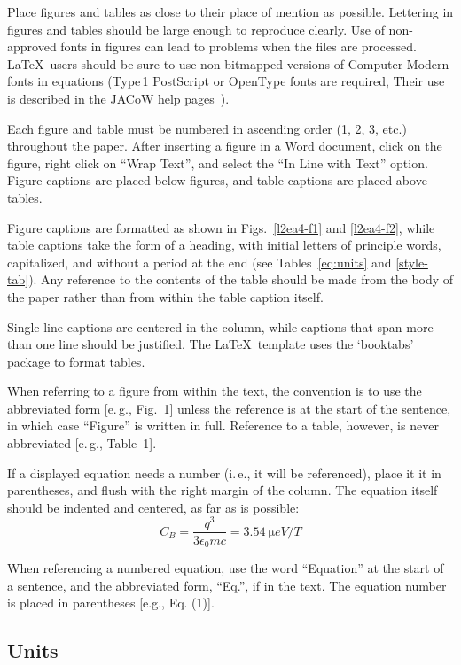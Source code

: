 \documentclass[letterpaper,  %
              ]{jacow-2_3}   %
\begin{document}
{{Place figures and tables as close to their place of mention as
possible. Lettering in figures and tables should be large enough to
reproduce clearly. Use of non-approved fonts in figures can lead to
problems when the files are processed. \LaTeX\ users should be sure to use
non-bitmapped versions of Computer Modern fonts in equations (Type\,1 PostScript
or OpenType fonts are required, Their use is described in the JACoW help
pages~\cite{jacow-help}).

Each figure and table must be numbered in ascending
order (1, 2, 3, etc.) throughout the paper. After inserting a
figure in a Word document, click on the figure, right click
on “Wrap Text”, and select the “In Line with Text” option.
Figure captions are placed below figures, and table
captions are placed above tables.

Figure captions are formatted as shown in Figs.~\ref{l2ea4-f1} and \ref{l2ea4-f2},
while table captions take the form of a heading,
with initial letters of principle words, capitalized, and
without a period at the end (see Tables~\ref{eq:units} and \ref{style-tab}).
Any reference to the contents of the table should be made from
the body of the paper rather than from within the table
caption itself.

 Single-line captions are centered in the column, while captions
that span more than one line should be justified.
The \LaTeX\ template uses the ‘booktabs’ package to
format tables.

When referring to a figure from within the text, the
convention is to use the abbreviated form [e.\,g., Fig.~1]
unless the reference is at the start of the sentence, in
which case “Figure” is written in full. Reference to a
table, however, is never abbreviated [e.\,g., Table~1].


If a displayed equation needs a number (i.\,e., it will be
referenced), place it it in parentheses, and flush with the
right margin of the column. The equation itself should be
indented and centered, as far as is possible:
\begin{equation}\label{eq:units}
    C_B=\frac{q^3}{3\epsilon_{0} mc}=\SI{3.54}{\micro eV/T}
\end{equation}

When referencing a numbered equation, use the word
“Equation” at the start of a sentence, and the abbreviated
form, “Eq.”, if in the text. The equation number is placed
in parentheses [e.g., Eq. (1)].

\subsection{Units}
	
}}
\end{document}
